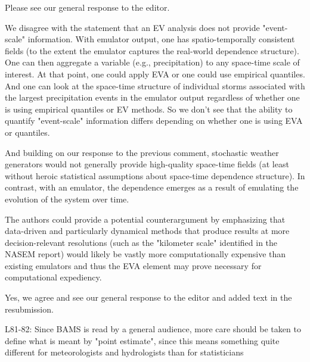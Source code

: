 \documentclass[12pt,english]{reviewresponse}
\begin{document}
\begin{revresponse}
Please see our general response to the editor.  

We disagree with the statement that an EV analysis does not provide "event-scale" information.
With emulator output, one has spatio-temporally consistent fields (to the extent the emulator captures the real-world dependence structure). One can then aggregate a variable (e.g., precipitation) to any space-time scale of interest. At that point, one could apply EVA or one could use empirical quantiles. And one can look at the space-time structure of individual storms associated with the largest precipitation events in the emulator output regardless of whether one is using empirical quantiles or EV methods. So we don't see that the ability to quantify "event-scale" information differs depending on whether one is using EVA or quantiles. 

And building on our response to the previous comment, stochastic weather generators would not generally provide high-quality space-time fields (at least without heroic statistical assumptions about space-time dependence structure). In contrast, with an emulator, the dependence emerges as a result of emulating the evolution of the system over time.  



\end{revresponse}

\begin{revcomment}
The authors could provide a potential  counterargument by emphasizing that data-driven and particularly dynamical methods that produce results at more decision-relevant resolutions (such as the "kilometer scale" identified in the NASEM report) would likely be vastly more computationally expensive than existing emulators and thus the EVA element may prove necessary for computational expediency.
\end{revcomment}
\begin{revresponse}
Yes, we agree and see our general response to the editor and added text in the resubmission.
\end{revresponse}

\begin{revcomment}
  L81-82: Since BAMS is read by a general audience, more care should be taken to define what is meant by "point estimate", since this means something quite different for meteorologists and hydrologists than for statisticians
  
\end{revcomment}
\end{document}

